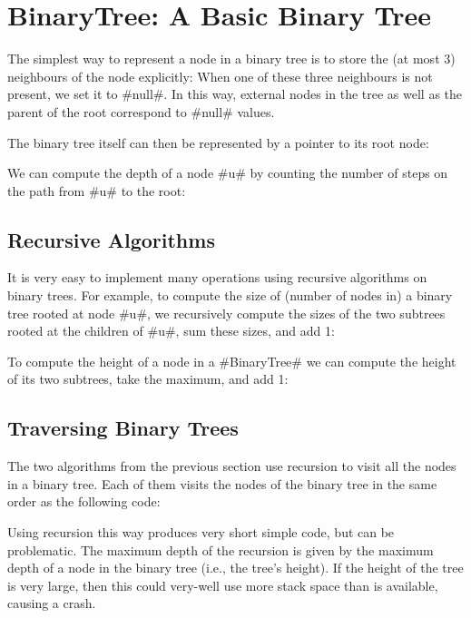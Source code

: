 \section{BinaryTree: A Basic Binary Tree}

The simplest way to represent a node in a binary tree is
to store the (at most 3) neighbours of the node explicitly:
When one of these three neighbours is not present, we set it to #null#.
In this way, external nodes in the tree as well as the parent of the
root correspond to #null# values.

The binary tree itself can then be represented by a pointer to its root node:

We can compute the depth of a node #u# by counting the number of steps on the path from #u# to the root:


\subsection{Recursive Algorithms}

It is very easy to implement many operations using recursive algorithms on
binary trees.  For example, to compute the size of (number of nodes in)
a binary tree rooted at node #u#, we recursively compute the sizes of
the two subtrees rooted at the children of #u#, sum these sizes, and add 1:


To compute the height of a node in a #BinaryTree# we can compute the
height of its two subtrees, take the maximum, and add 1:


\subsection{Traversing Binary Trees}

The two algorithms from the previous section use recursion to visit all
the nodes in a binary tree.  Each of them visits the nodes of the binary tree in the same order as the following code:

Using recursion this way produces very short simple code, but can
be problematic.  The maximum depth of the recursion is given by the
maximum depth of a node in the binary tree (i.e., the tree's height).
If the height of the tree is very large, then this could very-well use
more stack space than is available, causing a crash.  

